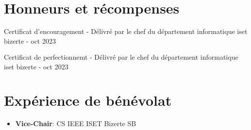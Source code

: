 \documentclass[a4paper,20pt]{article}
\newcommand{\resumeItem}[2]{
  \item\small{
    \textbf{#1}{: #2 \vspace{-2pt}}
  }
}
\newcommand{\resumeSubHeadingListStart}{\begin{itemize}[leftmargin=*]}
\newcommand{\resumeSubHeadingListEnd}{\end{itemize}}
\begin{document}
\section{Honneurs et récompenses}
\begin{description}[font=$\bullet$]
\item {Certificat d'encouragement - Délivré par le chef du département informatique iset bizerte - oct 2023}
\item {Certificat de perfectionnemt - Délivré par le chef du département informatique iset bizerte - oct 2023}
\end{description}

\vspace{-2pt}
\section{Expérience de bénévolat}
  \resumeSubHeadingListStart
	\resumeItem
    {Vice-Chair}
    {CS IEEE ISET Bizerte SB}
\vspace{5pt}
\resumeSubHeadingListEnd
\end{document}
